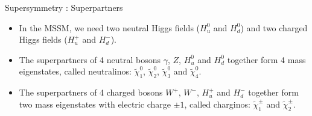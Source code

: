 \documentclass[mathserif,serif]{beamer}
\begin{document}
\begin{frame}{Supersymmetry : Superpartners}
\begin{itemize}
\item In the MSSM, we need two neutral Higgs fields ($H^0_u$ and $H^0_d$) and two charged Higgs fields ($H^+_u$ and $H^-_d$).
\item The superpartners of 4 neutral bosons $\gamma$, $Z$, $H^0_u$ and $H^0_d$ together form 4 mass eigenstates, called neutralinos: $\tilde{\chi}_1^0$, $\tilde{\chi}_2^0$, $\tilde{\chi}_3^0$ and $\tilde{\chi}_4^0$.
\item The superpartners of 4 charged bosons $W^+$, $W^-$, $H^+_u$ and $H^-_d$ together form two mass eigenstates with electric charge $\pm 1$, called charginos: $\tilde{\chi}_1^\pm$ and $\tilde{\chi}_2^\pm$.
\end{itemize}

\begin{table}[htbp]
\tiny
\centering
{}
\caption{\scriptsize The spin and R-parity for the Standard Model particles and their superpartners.}
\end{table}

\end{frame}
\end{document}
